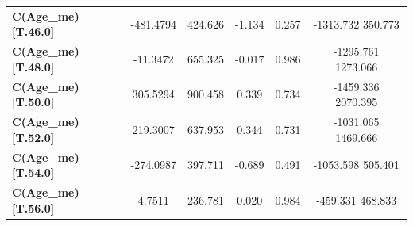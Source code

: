 \begin{subappendices}
\begin{table}[H]
{\begin{tabular}{lccccc}
\textbf{C(Age_me)[T.46.0]}                                           &    -481.4794  &      424.626     &    -1.134  &         0.257        &     -1313.732   350.773       \\
\textbf{C(Age_me)[T.48.0]}                                           &     -11.3472  &      655.325     &    -0.017  &         0.986        &     -1295.761  1273.066       \\
\textbf{C(Age_me)[T.50.0]}                                           &     305.5294  &      900.458     &     0.339  &         0.734        &     -1459.336  2070.395       \\
\textbf{C(Age_me)[T.52.0]}                                           &     219.3007  &      637.953     &     0.344  &         0.731        &     -1031.065  1469.666       \\
\textbf{C(Age_me)[T.54.0]}                                           &    -274.0987  &      397.711     &    -0.689  &         0.491        &     -1053.598   505.401       \\
\textbf{C(Age_me)[T.56.0]}                                           &       4.7511  &      236.781     &     0.020  &         0.984        &      -459.331   468.833       \\

\end{tabular}}
\end{table}
\end{subappendices}
